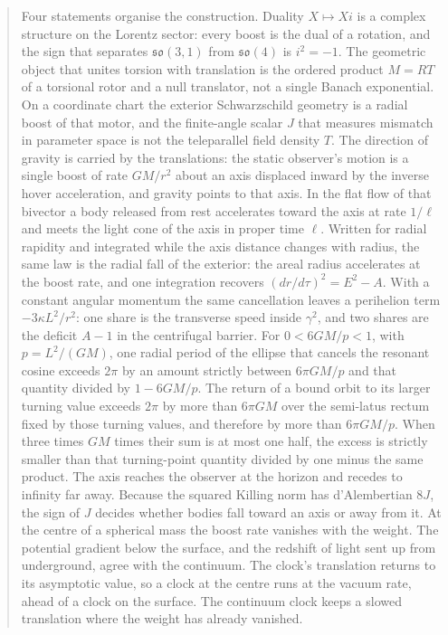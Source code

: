 \documentclass[a4paper]{article}
\begin{document}
\begin{abstract}
Four statements organise the construction. Duality \(X\mapsto Xi\) is a complex structure on the Lorentz sector: every boost is the dual of a rotation, and the sign that separates \(\mathfrak{so}(3,1)\) from \(\mathfrak{so}(4)\) is \(i^{2}=-1\). The geometric object that unites torsion with translation is the ordered product \(M=RT\) of a torsional rotor and a null translator, not a single Banach exponential. On a coordinate chart the exterior Schwarzschild geometry is a radial boost of that motor, and the finite-angle scalar \(J\) that measures mismatch in parameter space is not the teleparallel field density \(T\). The direction of gravity is carried by the translations: the static observer's motion is a single boost of rate \(GM/r^{2}\) about an axis displaced inward by the inverse hover acceleration, and gravity points to that axis. In the flat flow of that bivector a body released from rest accelerates toward the axis at rate \(1/\ell\) and meets the light cone of the axis in proper time \(\ell\). Written for radial rapidity and integrated while the axis distance changes with radius, the same law is the radial fall of the exterior: the areal radius accelerates at the boost rate, and one integration recovers \((dr/d\tau)^{2}=E^{2}-A\). With a constant angular momentum the same cancellation leaves a perihelion term \(-3\kappa L^{2}/r^{2}\): one share is the transverse speed inside \(\gamma^{2}\), and two shares are the deficit \(A-1\) in the centrifugal barrier. For \(0<6GM/p<1\), with \(p=L^{2}/(GM)\), one radial period of the ellipse that cancels the resonant cosine exceeds \(2\pi\) by an amount strictly between \(6\pi GM/p\) and that quantity divided by \(1-6GM/p\). The return of a bound orbit to its larger turning value exceeds \(2\pi\) by more than \(6\pi GM\) over the semi-latus rectum fixed by those turning values, and therefore by more than \(6\pi GM/p\). When three times \(GM\) times their sum is at most one half, the excess is strictly smaller than that turning-point quantity divided by one minus the same product. The axis reaches the observer at the horizon and recedes to infinity far away. Because the squared Killing norm has d'Alembertian \(8J\), the sign of \(J\) decides whether bodies fall toward an axis or away from it. At the centre of a spherical mass the boost rate vanishes with the weight. The potential gradient below the surface, and the redshift of light sent up from underground, agree with the continuum. The clock's translation returns to its asymptotic value, so a clock at the centre runs at the vacuum rate, ahead of a clock on the surface. The continuum clock keeps a slowed translation where the weight has already vanished.
\end{abstract}
\end{document}

